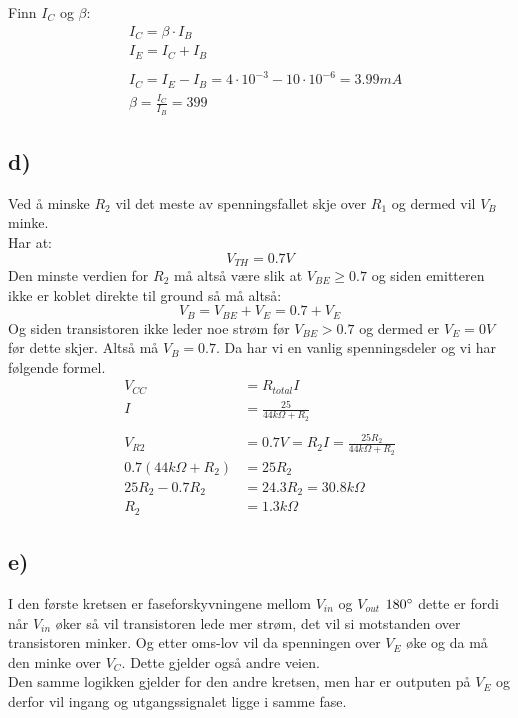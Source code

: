 \documentclass[a4paper, norsk, twoside, 10pt]{article}
\begin{document}
Finn $I_{C}$ og $\beta$:\\
\begin{align*}
  &I_{C} = \beta \cdot I_{B} \\
  &I_{E} = I_{C} + I_{B} \\
  \\
  &I_{C} = I_{E} - I_{B} = 4\cdot 10^{-3} - 10\cdot 10^{-6} = 3.99mA \\
  &\beta = \frac{I_{C}}{I_{B}} = 399
\end{align*}


\subsection*{d)}
Ved å minske $R_{2}$ vil det meste av spenningsfallet skje over $R_{1}$ og dermed vil $V_{B}$ minke. \\
Har at: \[V_{TH} = 0.7V \]
Den minste verdien for $R_{2}$ må altså være slik at $V_{BE} \geq 0.7$ og siden emitteren ikke er koblet direkte til ground så må altså:
\[V_{B} = V_{BE} +V_{E} = 0.7 + V_{E}\]
Og siden transistoren ikke leder noe strøm før $V_{BE} > 0.7$ og dermed er $V_E = 0V$ før dette skjer. Altså må $V_B = 0.7$. Da har vi en vanlig spenningsdeler og vi har følgende formel.
\begin{align*}
  V_{CC} &= R_{total}I \\
  I &= \frac{25}{44k\Omega + R_2}\\
  \\
  V_{R2} &= 0.7V = R_2I = \frac{25R_2}{44k\Omega + R_2} \\
  0.7(44k\Omega + R_2) &= 25R_2 \\
  25R_2 -0.7R_2 &= 24.3R_2 = 30.8k\Omega \\
  R_2 &= 1.3k\Omega
\end{align*}


\subsection*{e)}

I den første kretsen er faseforskyvningene mellom $V_{in}$ og $V_{out}$ $180\degree$ dette er fordi når $V_{in}$ øker så vil transistoren lede mer strøm, det vil si motstanden over transistoren minker. Og etter oms-lov vil da spenningen over $V_E$ øke og da må den minke over $V_C$. Dette gjelder også andre veien.
\\
Den samme logikken gjelder for den andre kretsen, men har er outputen på $V_E$ og derfor vil ingang og utgangssignalet ligge i samme fase. 
\end{document}
